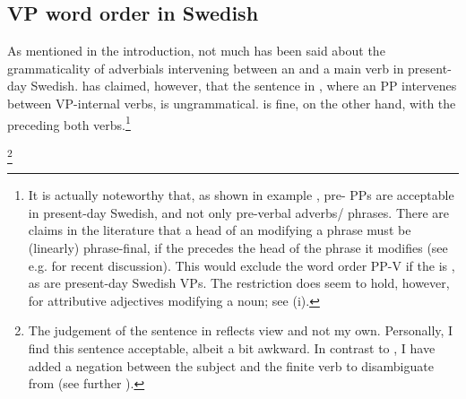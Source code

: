 \documentclass[output=paper, colorlinks, citecolor=brown]{langscibook}
\begin{document}
\subsection{VP word order in Swedish}\label{sec:sangfelt:3.2}

As mentioned in the introduction, not much has been said about the grammaticality of adverbials intervening between an  and a main verb in present-day Swedish. \citet[157]{Petzell2011} has claimed, however, that the sentence in , where an  PP intervenes between VP-internal verbs, is ungrammatical.  is fine, on the other hand, with the  preceding both verbs.\footnote{It is actually noteworthy that, as shown in example , pre- PPs are acceptable in present-day Swedish, and not only pre-verbal adverbs\slash {} phrases. There are claims in the literature that a head of an  modifying a  phrase must be (linearly) phrase-final, if the  precedes the head of the phrase it modifies (see e.g. \citet{Haider_left-left_nodate} for recent discussion). This would exclude the word order PP-V if the  is , as are present-day Swedish VPs. The restriction does seem to hold, however, for attributive adjectives modifying a noun; see (i). 
\z}

\ea {}\footnote{The judgement of the sentence in  reflects  view and not my own. Personally, I find this sentence acceptable, albeit a bit awkward. In contrast to \citet[157]{Petzell2011}, I have added a negation between the subject and the finite verb to disambiguate from  (see further ).}
\label{ex:sangfelt:15}

\z 
\z 
\end{document}
